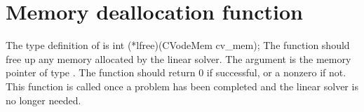 
\section{Memory deallocation function}
The type definition of  is
{
  int (*lfree)(CVodeMem cv\_mem);
}
{
  The function  should free up any memory allocated by the linear
  solver.
}
{
  The argument  is the {\cvodes} memory pointer of type .
}
{
  The  function should return 0 if successful, or a nonzero
  if not.
}
{
  This function is called once a problem has been completed and the 
  linear solver is no longer needed.
}
